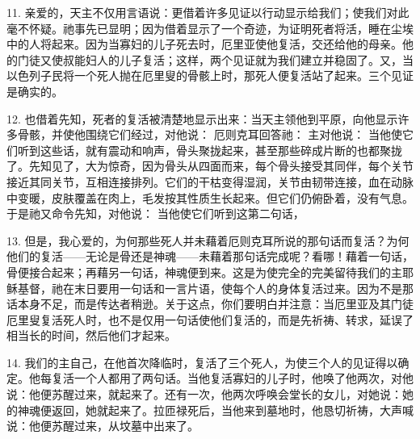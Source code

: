 11. 亲爱的，天主不仅用言语说：更借着许多见证以行动显示给我们；使我们对此毫不怀疑。祂事先已显明；因为借着显示了一个奇迹，为证明死者将活，睡在尘埃中的人将起来。因为当寡妇的儿子死去时，厄里亚使他复活，交还给他的母亲。他的门徒又使叔能妇人的儿子复活；这样，两个见证就为我们建立并稳固了。又，当以色列子民将一个死人抛在厄里叟的骨骸上时，那死人便复活站了起来。三个见证是确实的。\par

12. 也借着先知，死者的复活被清楚地显示出来：当天主领他到平原，向他显示许多骨骸，并使他围绕它们经过，对他说： 厄则克耳回答祂： 主对他说： 当他使它们听到这些话，就有震动和响声，骨头聚拢起来，甚至那些碎成片断的也都聚拢了。先知见了，大为惊奇，因为骨头从四面而来，每个骨头接受其同伴，每个关节接近其同关节，互相连接排列。它们的干枯变得湿润，关节由韧带连接，血在动脉中变暖，皮肤覆盖在肉上，毛发按其性质生长起来。但它们仍俯卧着，没有气息。于是祂又命令先知，对他说： 当他使它们听到这第二句话，\par

13. 但是，我心爱的，为何那些死人并未藉着厄则克耳所说的那句话而复活？为何他们的复活——无论是骨还是神魂——未藉着那句话完成呢？看哪！藉着一句话，骨便接合起来；再藉另一句话，神魂便到来。这是为使完全的完美留待我们的主耶稣基督，祂在末日要用一句话和一言片语，使每个人的身体复活过来。因为不是那话本身不足，而是传达者稍逊。关于这点，你们要明白并注意：当厄里亚及其门徒厄里叟复活死人时，也不是仅用一句话使他们复活的，而是先祈祷、转求，延误了相当长的时间，然后他们才起来。\par

14. 我们的主自己，在他首次降临时，复活了三个死人，为使三个人的见证得以确定。他每复活一个人都用了两句话。当他复活寡妇的儿子时，他唤了他两次，对他说：他便苏醒过来，就起来了。还有一次，他两次呼唤会堂长的女儿，对她说：她的神魂便返回，她就起来了。拉匝禄死后，当他来到墓地时，他恳切祈祷，大声喊说：他便苏醒过来，从坟墓中出来了。\par

